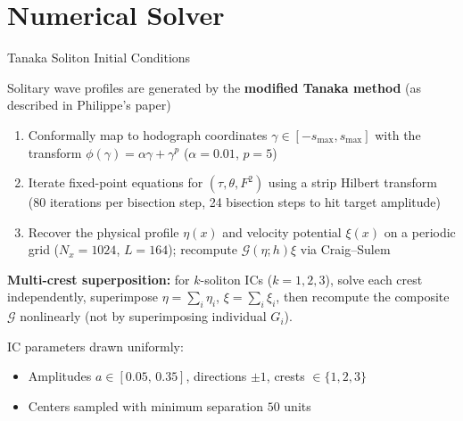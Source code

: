 \documentclass[aspectratio=169,11pt]{beamer}
\newcommand{\Gop}{\mathcal{G}}
\begin{document}
\section{Numerical Solver}

\begin{frame}{Tanaka Soliton Initial Conditions}

Solitary wave profiles are generated by the \textbf{modified Tanaka method} (as described in Philippe's paper)
\pause
\tiny{
\begin{enumerate}
  \item Conformally map to hodograph coordinates $\gamma \in [-s_{\max}, s_{\max}]$ with the transform $\phi(\gamma) = \alpha\gamma + \gamma^p$ \;($\alpha = 0.01$, $p = 5$)
  \item Iterate fixed-point equations for $(\tau, \theta, F^2)$ using a strip Hilbert transform (80 iterations per bisection step, 24 bisection steps to hit target amplitude)
  \item Recover the physical profile $\eta(x)$ and velocity potential $\xi(x)$ on a periodic grid ($N_x = 1024$, $L = 164$); recompute $\Gop(\eta;h)\xi$ via Craig--Sulem
\end{enumerate}
}

\pause
\small{
\textbf{Multi-crest superposition:} for $k$-soliton ICs ($k = 1, 2, 3$), solve each crest independently, superimpose $\eta = \sum_i \eta_i$, $\xi = \sum_i \xi_i$, then recompute the composite $\Gop$ nonlinearly (not by superimposing individual $G_i$).
}

\pause

IC parameters drawn uniformly:
\small{
\begin{itemize}
  \item Amplitudes $a \in [0.05,\, 0.35]$, directions $\pm 1$, crests $\in \{1, 2, 3\}$
  \item Centers sampled with minimum separation $50$ units
\end{itemize}
}
\end{frame}
\end{document}
